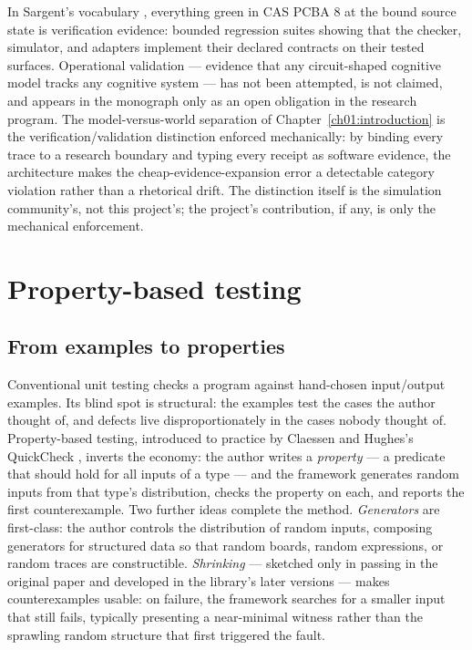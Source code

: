 In Sargent's vocabulary \cite{sargent}, everything green in CAS PCBA 8 at
the bound source state is verification evidence: bounded regression
suites showing that the checker, simulator, and adapters implement their
declared contracts on their tested surfaces. Operational validation ---
evidence that any circuit-shaped cognitive model tracks any cognitive
system --- has not been attempted, is not claimed, and appears in the
monograph only as an open obligation in the research program. The
model-versus-world separation of Chapter~\ref{ch01:introduction} is the
verification/validation distinction enforced mechanically: by binding
every trace to a research boundary and typing every receipt as software
evidence, the architecture makes the cheap-evidence-expansion error a
detectable category violation rather than a rhetorical drift. The
distinction itself is the simulation community's, not this project's;
the project's contribution, if any, is only the mechanical enforcement.

\section{Property-based testing}\label{ch02:pbt}

\subsection{From examples to properties}\label{ch02:pbt:idea}

Conventional unit testing checks a program against hand-chosen
input/output examples. Its blind spot is structural: the examples test
the cases the author thought of, and defects live disproportionately in
the cases nobody thought of. Property-based testing, introduced to
practice by Claessen and Hughes's QuickCheck \cite{quickcheck}, inverts
the economy: the author writes a \emph{property} --- a predicate that
should hold for all inputs of a type --- and the framework generates
random inputs from that type's distribution, checks the property on each,
and reports the first counterexample. Two further ideas complete the
method. \emph{Generators} are first-class: the author controls the
distribution of random inputs, composing generators for structured data
so that random boards, random expressions, or random traces are
constructible. \emph{Shrinking} --- sketched only in passing in the original paper and
developed in the library's later versions \cite{claessen} --- makes
counterexamples usable: on
failure, the framework searches for a smaller input that still fails,
typically presenting a near-minimal witness rather than the sprawling
random structure that first triggered the fault.

